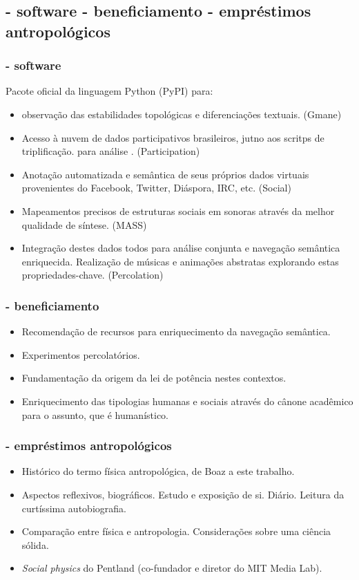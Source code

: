 \documentclass[10pt]{beamer}
\begin{document}
\begin{frame}
\subsection{- software \;\; - beneficiamento \;\; - empréstimos antropológicos}
\frametitle{- software}
Pacote oficial da linguagem Python (PyPI) para:
	\begin{itemize}
		\item observação das estabilidades topológicas e diferenciações textuais. (Gmane)
		\item Acesso à nuvem de dados participativos brasileiros, jutno aos scritps de triplificação. para análise . (Participation)
		\item Anotação automatizada e semântica de seus próprios dados virtuais provenientes do Facebook, Twitter, Diáspora, IRC, etc. (Social)
		\item Mapeamentos precisos de estruturas sociais em sonoras através da melhor qualidade de síntese. (MASS)
		\item Integração destes dados todos para análise conjunta e navegação semântica enriquecida. Realização de músicas e animações abstratas explorando estas propriedades-chave. (Percolation)
	\end{itemize}
\end{frame}

\begin{frame}
\frametitle{- beneficiamento}
\begin{itemize}
	\item Recomendação de recursos para enriquecimento da navegação semântica.
	\item Experimentos percolatórios.
	\item Fundamentação da origem da lei de potência nestes contextos.
	\item Enriquecimento das tipologias humanas e sociais através do cânone acadêmico para o assunto, que é humanístico.
\end{itemize}
\end{frame}

\begin{frame}
\frametitle{- empréstimos antropológicos}
\begin{itemize}
\item Histórico do termo física antropológica, de Boaz a este trabalho.
\item Aspectos reflexivos, biográficos. Estudo e exposição de si. Diário. Leitura da curtíssima autobiografia.
\item Comparação entre física e antropologia. Considerações sobre uma ciência sólida.
\item \emph{Social physics} do Pentland (co-fundador e diretor do MIT Media Lab).
\end{itemize}
\end{frame}
\end{document}
